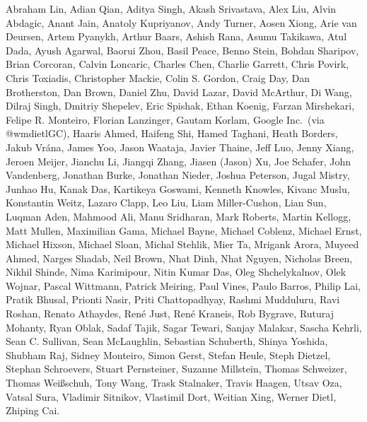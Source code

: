 Abraham Lin,
Adian Qian,
Aditya Singh,
Akash Srivastava,
Alex Liu,
Alvin Abdagic,
Anant Jain,
Anatoly Kupriyanov,
Andy Turner,
Aosen Xiong,
Arie van Deursen,
Artem Pyanykh,
Arthur Baars,
Ashish Rana,
Asumu Takikawa,
Atul Dada,
Ayush Agarwal,
Baorui Zhou,
Basil Peace,
Benno Stein,
Bohdan Sharipov,
Brian Corcoran,
Calvin Loncaric,
Charles Chen,
Charlie Garrett,
Chris Povirk,
Chris Toxiadis,
Christopher Mackie,
Colin S. Gordon,
Craig Day,
Dan Brotherston,
Dan Brown,
Daniel Zhu,
David Lazar,
David McArthur,
Di Wang,
Dilraj Singh,
Dmitriy Shepelev,
Eric Spishak,
Ethan Koenig,
Farzan Mirshekari,
Felipe R. Monteiro,
Florian Lanzinger,
Gautam Korlam,
Google Inc.\ (via @wmdietlGC),
Haaris Ahmed,
Haifeng Shi,
Hamed Taghani,
Heath Borders,
Jakub Vr\'ana,
James Yoo,
Jason Waataja,
Javier Thaine,
Jeff Luo,
Jenny Xiang,
Jeroen Meijer,
Jianchu Li,
Jiangqi Zhang,
Jiasen (Jason) Xu,
Joe Schafer,
John Vandenberg,
Jonathan Burke,
Jonathan Nieder,
Joshua Peterson,
Jugal Mistry,
Junhao Hu,
Kanak Das,
Kartikeya Goswami,
Kenneth Knowles,
Kivanc Muslu,
Konstantin Weitz,
Lazaro Clapp,
Leo Liu,
Liam Miller-Cushon,
Lian Sun,
Luqman Aden,
Mahmood Ali,
Manu Sridharan,
Mark Roberts,
Martin Kellogg,
Matt Mullen,
Maximilian Gama,
Michael Bayne,
Michael Coblenz,
Michael Ernst,
Michael Hixson,
Michael Sloan,
Michal Stehlik,
Mier Ta,
Mrigank Arora,
Muyeed Ahmed,
Narges Shadab,
Neil Brown,
Nhat Dinh,
Nhat Nguyen,
Nicholas Breen,
Nikhil Shinde,
Nima Karimipour,
Nitin Kumar Das,
Oleg Shchelykalnov,
Olek Wojnar,
Pascal Wittmann,
Patrick Meiring,
Paul Vines,
Paulo Barros,
Philip Lai,
Pratik Bhusal,
Prionti Nasir,
Priti Chattopadhyay,
Rashmi Mudduluru,
Ravi Roshan,
Renato Athaydes,
Ren\'e Just,
Ren\'e Kraneis,
Rob Bygrave,
Ruturaj Mohanty,
Ryan Oblak,
Sadaf Tajik,
Sagar Tewari,
Sanjay Malakar,
Sascha Kehrli,
Sean C. Sullivan,
Sean McLaughlin,
Sebastian Schuberth,
Shinya Yoshida,
Shubham Raj,
Sidney Monteiro,
Simon Gerst,
Stefan Heule,
Steph Dietzel,
Stephan Schroevers,
Stuart Pernsteiner,
Suzanne Millstein,
Thomas Schweizer,
Thomas Wei\ss schuh,
Tony Wang,
Trask Stalnaker,
Travis Haagen,
Utsav Oza,
Vatsal Sura,
Vladimir Sitnikov,
Vlastimil Dort,
Weitian Xing,
Werner Dietl,
Zhiping Cai.
